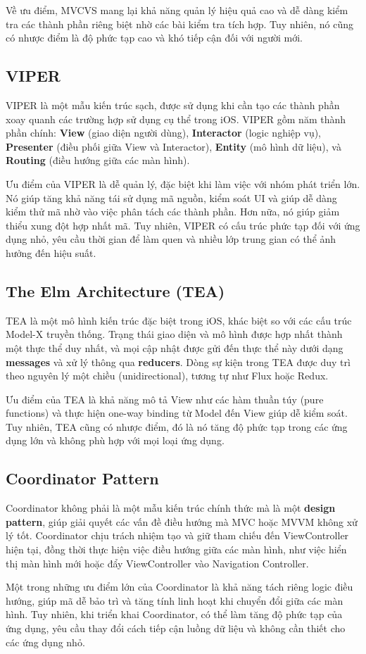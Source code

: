   Về ưu điểm, MVCVS mang lại khả năng quản lý hiệu quả cao và dễ dàng kiểm tra các thành phần riêng biệt nhờ các bài kiểm tra tích hợp. Tuy nhiên, nó cũng có nhược điểm là độ phức tạp cao và khó tiếp cận đối với người mới.

  \subsection{VIPER}

  VIPER là một mẫu kiến trúc sạch, được sử dụng khi cần tạo các thành phần xoay quanh các trường hợp sử dụng cụ thể trong iOS. VIPER gồm năm thành phần chính: \textbf{View} (giao diện người dùng), \textbf{Interactor} (logic nghiệp vụ), \textbf{Presenter} (điều phối giữa View và Interactor), \textbf{Entity} (mô hình dữ liệu), và \textbf{Routing} (điều hướng giữa các màn hình).

  Ưu điểm của VIPER là dễ quản lý, đặc biệt khi làm việc với nhóm phát triển lớn. Nó giúp tăng khả năng tái sử dụng mã nguồn, kiểm soát UI và giúp dễ dàng kiểm thử mã nhờ vào việc phân tách các thành phần. Hơn nữa, nó giúp giảm thiểu xung đột hợp nhất mã. Tuy nhiên, VIPER có cấu trúc phức tạp đối với ứng dụng nhỏ, yêu cầu thời gian để làm quen và nhiều lớp trung gian có thể ảnh hưởng đến hiệu suất.

  \subsection{The Elm Architecture (TEA)}

  TEA là một mô hình kiến trúc đặc biệt trong iOS, khác biệt so với các cấu trúc Model-X truyền thống. Trạng thái giao diện và mô hình được hợp nhất thành một thực thể duy nhất, và mọi cập nhật được gửi đến thực thể này dưới dạng \textbf{messages} và xử lý thông qua \textbf{reducers}. Dòng sự kiện trong TEA được duy trì theo nguyên lý một chiều (unidirectional), tương tự như Flux hoặc Redux.

  Ưu điểm của TEA là khả năng mô tả View như các hàm thuần túy (pure functions) và thực hiện one-way binding từ Model đến View giúp dễ kiểm soát. Tuy nhiên, TEA cũng có nhược điểm, đó là nó tăng độ phức tạp trong các ứng dụng lớn và không phù hợp với mọi loại ứng dụng.

  \subsection{Coordinator Pattern}

  Coordinator không phải là một mẫu kiến trúc chính thức mà là một \textbf{design pattern}, giúp giải quyết các vấn đề điều hướng mà MVC hoặc MVVM không xử lý tốt. Coordinator chịu trách nhiệm tạo và giữ tham chiếu đến ViewController hiện tại, đồng thời thực hiện việc điều hướng giữa các màn hình, như việc hiển thị màn hình mới hoặc đẩy ViewController vào Navigation Controller.

  Một trong những ưu điểm lớn của Coordinator là khả năng tách riêng logic điều hướng, giúp mã dễ bảo trì và tăng tính linh hoạt khi chuyển đổi giữa các màn hình. Tuy nhiên, khi triển khai Coordinator, có thể làm tăng độ phức tạp của ứng dụng, yêu cầu thay đổi cách tiếp cận luồng dữ liệu và không cần thiết cho các ứng dụng nhỏ.